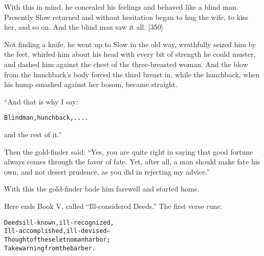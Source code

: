 \documentclass{article}
\renewenvironment{verbatim}{\begin{alltt}\normalfont\begin{centering}}{\end{centering}\end{alltt}}
\begin{document}
With this in mind, he concealed his feelings and behaved like a
blind man. Presently Slow returned and without hesitation began to
hug the wife, to kiss her, and so on. And the blind man saw it all.
[350]

Not finding a knife, he went up to Slow in the old way, wrathfully
seized him by the feet, whirled him about his head with every bit
of strength he could muster, and dashed him against the chest of
the three-breasted woman. And the blow from the hunchback's body
forced the third breast in, while the hunchback, when his hump
smashed against her bosom, became straight.

“And that is why I say:

\begin{verbatim}
Blind man, hunchback, . . . .
\end{verbatim}
and the rest of it.”

Then the gold-finder said:
``Yes, you are quite right in saying that good fortune always comes through the favor of fate. Yet, after all, a man should make fate his own, and not desert prudence, as you did in rejecting my advice.''

With this the gold-finder bade him farewell and started home.

Here ends Book V, called ``Ill-considered Deeds.'' The first verse
runs:

\begin{verbatim}
Deeds ill-known, ill-recognized,
Ill-accomplished, ill-devised--
Thought of these let no man harbor;
Take warning from the barber.
\end{verbatim}
\end{document}
